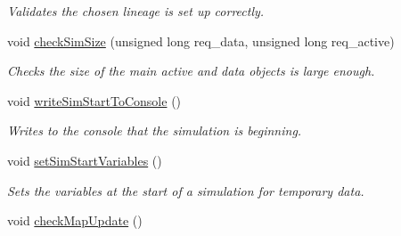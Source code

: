 \begin{DoxyCompactItemize}
\begin{DoxyCompactList}\small\item\em Validates the chosen lineage is set up correctly. \end{DoxyCompactList}\item 
void \hyperlink{class_tree_ab8a62d0ca2b1746676073e3f33e2a949}{check\+Sim\+Size} (unsigned long req\+\_\+data, unsigned long req\+\_\+active)
\begin{DoxyCompactList}\small\item\em Checks the size of the main active and data objects is large enough. \end{DoxyCompactList}\item 
void \hyperlink{class_tree_a95360a2f62ef0eb436d586552b299e1f}{write\+Sim\+Start\+To\+Console} ()\hypertarget{class_tree_a95360a2f62ef0eb436d586552b299e1f}{}\label{class_tree_a95360a2f62ef0eb436d586552b299e1f}

\begin{DoxyCompactList}\small\item\em Writes to the console that the simulation is beginning. \end{DoxyCompactList}\item 
void \hyperlink{class_tree_a1ba0f5d27c6ef6e9e17f988aff2dfe65}{set\+Sim\+Start\+Variables} ()
\begin{DoxyCompactList}\small\item\em Sets the variables at the start of a simulation for temporary data. \end{DoxyCompactList}\item 
void \hyperlink{class_tree_a01555697d3320e2cd9ee40f6747d5206}{check\+Map\+Update} ()\hypertarget{class_tree_a01555697d3320e2cd9ee40f6747d5206}{}\label{class_tree_a01555697d3320e2cd9ee40f6747d5206}


\end{DoxyCompactItemize}
